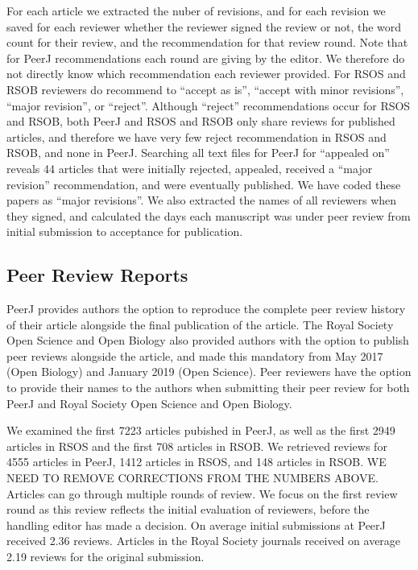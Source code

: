 \documentclass[,jou, a4paper,floatsintext]{apa6}
\begin{document}
For each article we extracted the nuber of revisions, and for each revision we saved for each reviewer whether the reviewer signed the review or not, the word count for their review, and the recommendation for that review round. Note that for PeerJ recommendations each round are giving by the editor. We therefore do not directly know which recommendation each reviewer provided. For RSOS and RSOB reviewers do recommend to \enquote{accept as is}, \enquote{accept with minor revisions}, \enquote{major revision}, or \enquote{reject}. Although \enquote{reject} recommendations occur for RSOS and RSOB, both PeerJ and RSOS and RSOB only share reviews for published articles, and therefore we have very few reject recommendation in RSOS and RSOB, and none in PeerJ. Searching all text files for PeerJ for \enquote{appealed on} reveals 44 articles that were initially rejected, appealed, received a \enquote{major revision} recommendation, and were eventually published. We have coded these papers as \enquote{major revisions}. We also extracted the names of all reviewers when they signed, and calculated the days each manuscript was under peer review from initial submission to acceptance for publication.

\hypertarget{peer-review-reports}{%
\subsection{Peer Review Reports}\label{peer-review-reports}}

PeerJ provides authors the option to reproduce the complete peer review history of their article alongside the final publication of the article.
The Royal Society Open Science and Open Biology also provided authors with the option to publish peer reviews alongside the article, and made this mandatory from May 2017 (Open Biology) and January 2019 (Open Science).
Peer reviewers have the option to provide their names to the authors when submitting their peer review for both PeerJ and Royal Society Open Science and Open Biology.

We examined the first 7223 articles pubished in PeerJ, as well as the first 2949 articles in RSOS and the first 708 articles in RSOB. We retrieved reviews for 4555 articles in PeerJ, 1412 articles in RSOS, and 148 articles in RSOB. WE NEED TO REMOVE CORRECTIONS FROM THE NUMBERS ABOVE. Articles can go through multiple rounds of review. We focus on the first review round as this review reflects the initial evaluation of reviewers, before the handling editor has made a decision. On average initial submissions at PeerJ received 2.36 reviews. Articles in the Royal Society journals received on average 2.19 reviews for the original submission.
\end{document}
